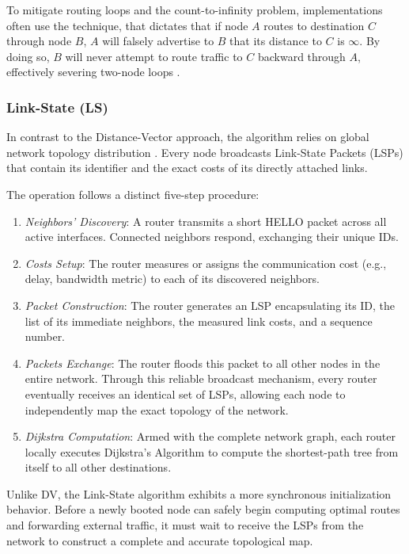 \vspace{2mm}
To mitigate routing loops and the count-to-infinity problem, implementations often use the  technique, that dictates that if node \(A\) routes to destination \(C\) through node \(B\), \(A\) will falsely advertise to \(B\) that its distance to \(C\) is \(\infty\). By doing so, \(B\) will never attempt to route traffic to \(C\) backward through \(A\), effectively severing two-node loops \cite{rfc2453}.

\subsubsection{Link-State (LS)}
In contrast to the Distance-Vector approach, the  algorithm relies on global network topology distribution \cite{rfc2328}. Every node broadcasts Link-State Packets (LSPs) that contain its identifier and the exact costs of its directly attached links.

The operation follows a distinct five-step procedure:
\begin{enumerate}
    \item \emph{Neighbors' Discovery}: A router transmits a short HELLO packet across all active interfaces. Connected neighbors respond, exchanging their unique IDs.
    \item \emph{Costs Setup}: The router measures or assigns the communication cost (e.g., delay, bandwidth metric) to each of its discovered neighbors.
    \item \emph{Packet Construction}: The router generates an LSP encapsulating its ID, the list of its immediate neighbors, the measured link costs, and a sequence number.
    \item \emph{Packets Exchange}: The router floods this packet to all other nodes in the entire network. Through this reliable broadcast mechanism, every router eventually receives an identical set of LSPs, allowing each node to independently map the exact topology of the network.
    \item \emph{Dijkstra Computation}: Armed with the complete network graph, each router locally executes Dijkstra's Algorithm to compute the shortest-path tree from itself to all other destinations.
\end{enumerate}

Unlike DV, the Link-State algorithm exhibits a more synchronous initialization behavior. Before a newly booted node can safely begin computing optimal routes and forwarding external traffic, it must wait to receive the LSPs from the network to construct a complete and accurate topological map.

